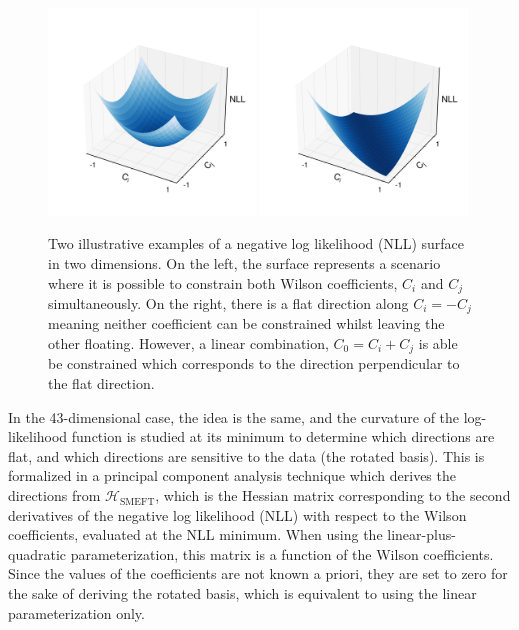 \begin{figure}
  \centering
  \includegraphics[width=0.49\textwidth]{Figures/EFT/pca_toy_a.pdf}
  \includegraphics[width=0.49\textwidth]{Figures/EFT/pca_toy_b.pdf}
  \caption[PCA Illustration]{Two illustrative examples of a negative log likelihood (NLL) surface in two dimensions. On the left, the surface represents a scenario where it is possible to constrain both Wilson coefficients, $C_i$ and $C_j$ simultaneously. On the right, there is a flat direction along $C_i = -C_j$ meaning neither coefficient can be constrained whilst leaving the other floating. However, a linear combination, $C_0=C_i+C_j$ is able be constrained which corresponds to the direction perpendicular to the flat direction.}\label{fig:pca_toy}
\end{figure}

In the 43-dimensional case, the idea is the same, and the curvature of the log-likelihood function is studied at its minimum to determine which directions are flat, and which directions are sensitive to the data (the rotated basis). This is formalized in a principal component analysis technique which derives the directions from $\mathcal{H}_{\text{SMEFT}}$, which is the Hessian matrix corresponding to the second derivatives of the negative log likelihood (NLL) with respect to the Wilson coefficients, evaluated at the NLL minimum. When using the linear-plus-quadratic parameterization, this matrix is a function of the Wilson coefficients. Since the values of the coefficients are not known a priori, they are set to zero for the sake of deriving the rotated basis, which is equivalent to using the linear parameterization only.

